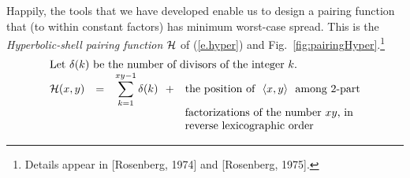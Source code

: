 \medskip

Happily, the tools that we have developed enable us to design a pairing function that (to within constant factors) has minimum worst-case spread.  This is the {\em Hyperbolic-shell pairing function} $\mbox{$\cal H$}$ of (\ref{e.hyper}) and Fig.~\ref{fig:pairingHyper}.\footnote{Details appear in
[Rosenberg, 1974] and [Rosenberg, 1975].}
\begin{equation}
\label{e.hyper}
\begin{array}{lcll}
\multicolumn{4}{l}{\mbox{Let $\delta(k)$ be the number of divisors of the integer $k$.}} \\
\h(x,y) & = & {\displaystyle \sum_{k=1}^{xy-1} \delta(k) \ \ +} &
  \mbox{the position of } \ \langle x, y \rangle \ \mbox{ among 2-part} \\
        &   &  & \mbox{factorizations of the number $xy$, in} \\
        &   &  & \mbox{reverse lexicographic order}
\end{array}
\end{equation}
